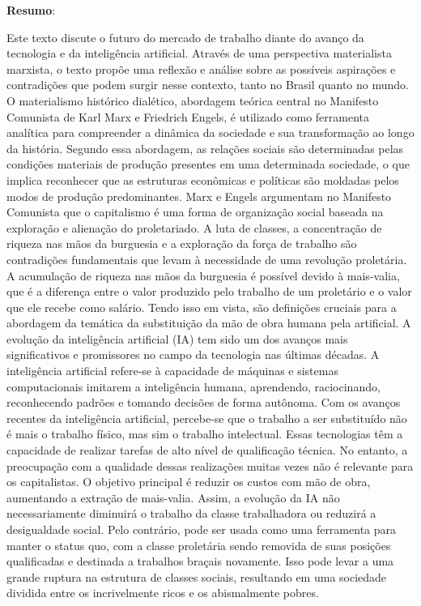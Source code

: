 \begin{titulo}
\raggedright\raggedright \textbf{Resumo}:
\end{titulo}
Este texto discute o futuro do mercado de trabalho diante do avanço da tecnologia e da inteligência artificial. Através de uma perspectiva materialista marxista, o texto propõe uma reflexão e análise sobre as possíveis aspirações e contradições que podem surgir nesse contexto, tanto no Brasil quanto no mundo.
O materialismo histórico dialético, abordagem teórica central no Manifesto Comunista de Karl Marx e Friedrich Engels, é utilizado como ferramenta analítica para compreender a dinâmica da sociedade e sua transformação ao longo da história. Segundo essa abordagem, as relações sociais são determinadas pelas condições materiais de produção presentes em uma determinada sociedade, o que implica reconhecer que as estruturas econômicas e políticas são moldadas pelos modos de produção predominantes.
Marx e Engels argumentam no Manifesto Comunista que o capitalismo é uma forma de organização social baseada na exploração e alienação do proletariado. A luta de classes, a concentração de riqueza nas mãos da burguesia e a exploração da força de trabalho são contradições fundamentais que levam à necessidade de uma revolução proletária. A acumulação de riqueza nas mãos da burguesia é possível devido à mais-valia, que é a diferença entre o valor produzido pelo trabalho de um proletário e o valor que ele recebe como salário. Tendo isso em vista, são definições cruciais para a abordagem da temática da substituição da mão de obra humana pela artificial.
A evolução da inteligência artificial (IA) tem sido um dos avanços mais significativos e promissores no campo da tecnologia nas últimas décadas. A inteligência artificial refere-se à capacidade de máquinas e sistemas computacionais imitarem a inteligência humana, aprendendo, raciocinando, reconhecendo padrões e tomando decisões de forma autônoma.
Com os avanços recentes da inteligência artificial, percebe-se que o trabalho a ser substituído não é mais o trabalho físico, mas sim o trabalho intelectual. Essas tecnologias têm a capacidade de realizar tarefas de alto nível de qualificação técnica. No entanto, a preocupação com a qualidade dessas realizações muitas vezes não é relevante para os capitalistas. O objetivo principal é reduzir os custos com mão de obra, aumentando a extração de mais-valia.
Assim, a evolução da IA não necessariamente diminuirá o trabalho da classe trabalhadora ou reduzirá a desigualdade social. Pelo contrário, pode ser usada como uma ferramenta para manter o status quo, com a classe proletária sendo removida de suas posições qualificadas e destinada a trabalhos braçais novamente. Isso pode levar a uma grande ruptura na estrutura de classes sociais, resultando em uma sociedade dividida entre os incrivelmente ricos e os abismalmente pobres.
